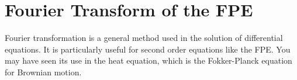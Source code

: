 \documentclass{article}
\begin{document}
\section{Fourier Transform of the FPE}

Fourier transformation is a general method used in the solution of differential equations. It is particularly useful for second order equations like the FPE. You may have seen its use in the heat equation, which is the Fokker-Planck equation for Brownian motion.
\end{document}
